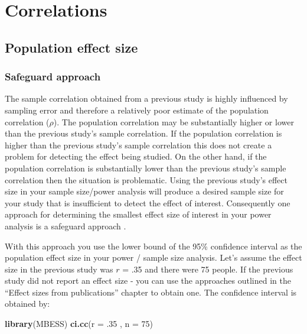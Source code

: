 \documentclass[
]{krantz}
\makeatletter
\newenvironment{Shaded}{\begin{snugshade}}{\end{snugshade}}
\newcommand{\DataTypeTok}[1]{\textcolor[rgb]{0.27,0.27,0.27}{#1}}
\newcommand{\DecValTok}[1]{\textcolor[rgb]{0.06,0.06,0.06}{#1}}
\newcommand{\FloatTok}[1]{\textcolor[rgb]{0.06,0.06,0.06}{#1}}
\newcommand{\KeywordTok}[1]{\textcolor[rgb]{0.27,0.27,0.27}{\textbf{#1}}}
\newcommand{\NormalTok}[1]{#1}
\newenvironment{kframe}{%
\medskip{}
\setlength{\fboxsep}{.8em}
 \def\at@end@of@kframe{}%
 \ifinner\ifhmode%
  \def\at@end@of@kframe{\end{minipage}}%
  \begin{minipage}{\columnwidth}%
 \fi\fi%
 \def\FrameCommand##1{\hskip\@totalleftmargin \hskip-\fboxsep
 \colorbox{shadecolor}{##1}\hskip-\fboxsep
     \hskip-\linewidth \hskip-\@totalleftmargin \hskip\columnwidth}%
 \MakeFramed {\advance\hsize-\width
   \@totalleftmargin\z@ \linewidth\hsize
   \@setminipage}}%
 {\par\unskip\endMakeFramed%
 \at@end@of@kframe}
\renewenvironment{Shaded}{\begin{kframe}}{\end{kframe}}
\makeatother
\begin{document}
\hypertarget{correlations}{%
\section{Correlations}\label{correlations}}

\hypertarget{population-effect-size-2}{%
\subsection{Population effect size}\label{population-effect-size-2}}

\hypertarget{safeguard-approach-2}{%
\subsubsection{Safeguard approach}\label{safeguard-approach-2}}

The sample correlation obtained from a previous study is highly influenced by sampling error and therefore a relatively poor estimate of the population correlation (\(\rho\)). The population correlation may be substantially higher or lower than the previous study's sample correlation. If the population correlation is higher than the previous study's sample correlation this does not create a problem for detecting the effect being studied. On the other hand, if the population correlation is substantially lower than the previous study's sample correlation then the situation is problematic. Using the previous study's effect size in your sample size/power analysis will produce a desired sample size for your study that is insufficient to detect the effect of interest. Consequently one approach for determining the smallest effect size of interest in your power analysis is a safeguard approach \citep{perugini2014safeguard}.

With this approach you use the lower bound of the 95\% confidence interval as the population effect size in your power / sample size analysis. Let's assume the effect size in the previous study was \(r\) = .35 and there were 75 people. If the previous study did not report an effect size - you can use the approaches outlined in the ``Effect sizes from publications'' chapter to obtain one. The confidence interval is obtained by:

\begin{Shaded}
\begin{Highlighting}[]
\KeywordTok{library}\NormalTok{(MBESS)}
\KeywordTok{ci.cc}\NormalTok{(}\DataTypeTok{r =} \FloatTok{.35}\NormalTok{ , }\DataTypeTok{n =} \DecValTok{75}\NormalTok{) }
\end{Highlighting}
\end{Shaded}
\end{document}
